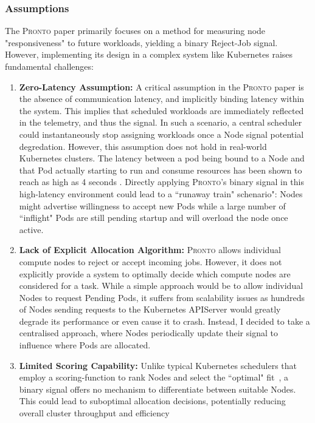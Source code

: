 \subsubsection{Assumptions}
The \textsc{Pronto} paper primarily focuses on a method for measuring node
"responsiveness" to future workloads, yielding a binary Reject-Job signal.
However, implementing its design in a complex system like Kubernetes raises
fundamental challenges:
\begin{enumerate}
    \item \textbf{Zero-Latency Assumption:} A critical assumption in the
        \textsc{Pronto} paper is the absence of communication latency, and
        implicitly binding latency within the system. This implies that
        scheduled workloads are immediately reflected in the telemetry, and thus
        the signal. In such a scenario, a central scheduler could
        instantaneously stop assigning workloads once a Node signal potential
        degredation. However, this assumption does not hold in real-world
        Kubernetes clusters. The latency between a pod being bound to a Node and
        that Pod actually starting to run and consume resources has been shown
        to reach as high as 4 seconds \cite{qadeer_scaling_2022}. Directly
        applying \textsc{Pronto}'s binary signal in this high-latency
        environment could lead to a ``runaway train" schenario": Nodes might
        advertise willingness to accept new Pods while a large number of
        ``inflight" Pods are still pending startup and will overload the node
        once active.
    \item \textbf{Lack of Explicit Allocation Algorithm:} \textsc{Pronto} allows
        individual compute nodes to reject or accept incoming jobs. However, it
        does not explicitly provide a system to optimally decide which compute
        nodes are considered for a task. While a simple approach would be to allow
        individual Nodes to request Pending Pods, it suffers from scalability
        issues as hundreds of Nodes sending requests to the Kubernetes APIServer
        would greatly degrade its performance or even cause it to crash.
        Instead, I decided to take a centralised approach, where Nodes
        periodically update their signal to influence where Pods are allocated.
    \item \textbf{Limited Scoring Capability:} Unlike typical Kubernetes
        schedulers that employ a scoring-function to rank Nodes and select the
        ``optimal" fit~\cite{kube-scheduler}, a binary signal offers no
        mechanism to differentiate between suitable Nodes. This could lead to
        suboptimal allocation decisions, potentially reducing overall cluster
        throughput and efficiency
\end{enumerate}
